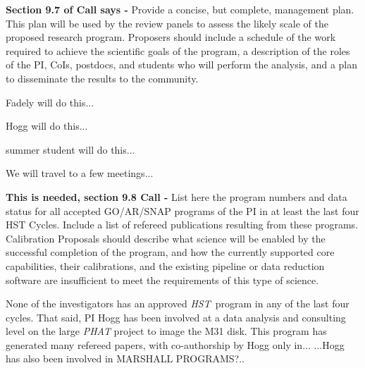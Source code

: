 \documentclass[12pt]{article}
\newcommand{\project}[1]{\textsl{#1}}
\newcommand{\HST}{\project{HST}}
\begin{document}
{\color{red} \textbf{Section 9.7 of Call says -} Provide a concise, but complete, 
management plan. This plan will be used by the review panels to assess 
the likely scale of the proposed research program. Proposers should 
include a schedule of the work required to achieve the scientific
goals of the program, a description of the roles of the PI, CoIs,
postdocs, and students who will perform the analysis, and a plan to 
disseminate the results to the community. }

Fadely will do this...

Hogg will do this...

summer student will do this...

We will travel to a few meetings...


%
%
%
\pasthstusage  %

{\color{red} \textbf{This is needed, section 9.8 Call -} List here the program 
numbers and data status for all accepted GO/AR/SNAP programs of the 
PI in at least the last four HST Cycles. Include a list of refereed 
publications resulting from these programs. Calibration Proposals 
should describe what science will be enabled by the successful 
completion of the program, and how the currently supported core 
capabilities, their calibrations, and the existing pipeline or data
reduction software are insufficient to meet the requirements of this 
type of science.}


None of the investigators has an approved \HST\ program in any of the
last four cycles.  That said, PI Hogg has been involved at a data
analysis and consulting level on the large \project{PHAT} project to
image the M31 disk.  This program has generated many refereed papers,
with co-authorship by Hogg only in...  ...Hogg has also been involved
in MARSHALL PROGRAMS?..


%
%




\end{document}
